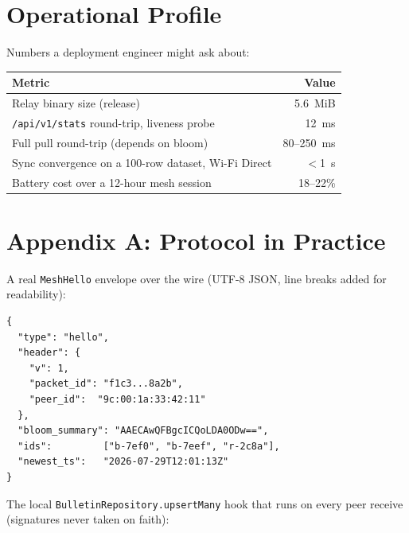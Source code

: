 \documentclass[11pt,a4paper]{article}
\begin{document}
\section{Operational Profile}
\label{sec:numbers}

Numbers a deployment engineer might ask about:

\begin{center}
\begin{tabular}{lr}
\toprule
\textbf{Metric} & \textbf{Value}\\
\midrule
Relay binary size (release) & 5.6~MiB\\
\texttt{/api/v1/stats} round-trip, liveness probe & 12~ms\\
Full pull round-trip (depends on bloom) & 80--250~ms\\
Sync convergence on a 100-row dataset, Wi-Fi Direct & $<$1~s\\
Battery cost over a 12-hour mesh session & 18--22\%\\
\bottomrule
\end{tabular}
\end{center}

\section{Appendix A: Protocol in Practice}
\label{sec:appendix-code}

A real \texttt{MeshHello} envelope over the wire (UTF-8 JSON, line
breaks added for readability):

\begin{lstlisting}[language=jsoncode]
{
  "type": "hello",
  "header": {
    "v": 1,
    "packet_id": "f1c3...8a2b",
    "peer_id":  "9c:00:1a:33:42:11"
  },
  "bloom_summary": "AAECAwQFBgcICQoLDA0ODw==",
  "ids":         ["b-7ef0", "b-7eef", "r-2c8a"],
  "newest_ts":   "2026-07-29T12:01:13Z"
}
\end{lstlisting}

The local \texttt{BulletinRepository.upsertMany} hook that runs on
every peer receive (signatures never taken on faith):
\end{document}
